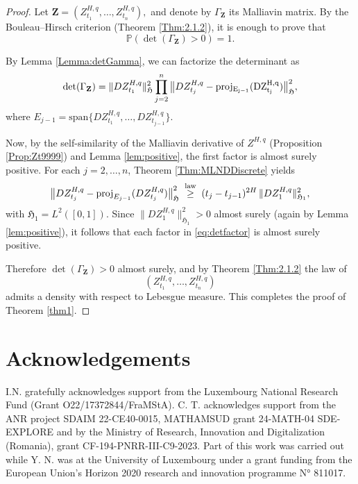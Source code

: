 \documentclass[a4paper,10pt]{article}
\theoremstyle{definition}
\theoremstyle{plain}
\newcommand\HHH{\mathfrak{H}}
\newcommand\1{\mathbbm{1}}
\newcommand\proj{\rm proj}
\begin{document}
\begin{proof} 
Let 
$
\mathbf{Z}=(Z^{H,q}_{t_1},\ldots, Z^{H,q}_{t_n}),
$
and denote by $\Gamma_{\mathbf{Z}}$ its Malliavin matrix.  
By the Bouleau--Hirsch criterion (Theorem \ref{Thm:2.1.2}), it is enough to prove that
\[
\mathbb{P}\!\left( \det (\Gamma_{\mathbf{Z}})>0\right)=1.
\]

By Lemma \ref{Lemma:detGamma}, we can factorize the determinant as
\begin{equation}\label{eq:detfactor}
\det(\Gamma_{\mathbf{Z}}) 
= \|DZ^{H,q}_{t_1}\|_{\HHH}^2
   \prod_{j=2}^n \big\|DZ^{H,q}_{t_j} - \proj_{E_{j-1}}(DZ^{H,q}_{t_j})\big\|_{\HHH}^2,
\end{equation}
where $E_{j-1}=\mathrm{span}\{DZ^{H,q}_{t_1},\ldots,DZ^{H,q}_{t_{j-1}}\}$.

Now, by the self-similarity of the Malliavin derivative of $Z^{H,q}$ (Proposition \ref{Prop:Zt9999}) and Lemma \ref{lem:positive}, the first factor is almost surely positive.
For each $j=2,\ldots,n$, Theorem \ref{Thm:MLNDDiscrete} yields
\[
\big\|DZ^{H,q}_{t_j} - {\rm proj}_{E_{j-1}}(DZ^{H,q}_{t_j})\big\|_{\HHH}^2
\;\overset{\text{law}}{\ge}\; (t_j-t_{j-1})^{2H}\,\|DZ^{H,q}_1\|_{\HHH_1}^2,
\]
with $\HHH_1=L^2([0,1])$.  
Since $\|DZ^{H,q}_1\|_{\HHH_1}^2>0$ almost surely (again by Lemma \ref{lem:positive}), it follows that each factor in \eqref{eq:detfactor} is almost surely positive.

Therefore $\det(\Gamma_{\mathbf{Z}})>0$ almost surely, and by Theorem \ref{Thm:2.1.2} the law of $$(Z^{H,q}_{t_1},\ldots,Z^{H,q}_{t_n})$$ admits a density with respect to Lebesgue measure.  
This completes the proof of Theorem \ref{thm1}.
\end{proof}



\section*{Acknowledgements}

I.N. gratefully acknowledges support from the Luxembourg National Research Fund (Grant O22/17372844/FraMStA).  C. T.  acknowledges support from   the  ANR project SDAIM 22-CE40-0015,  MATHAMSUD grant 24-MATH-04 SDE-EXPLORE and  by the Ministry of Research, Innovation and Digitalization (Romania), grant CF-194-PNRR-III-C9-2023.
Part of this work was carried out while Y. N. was at the University of Luxembourg under a grant funding from the European Union's Horizon 2020 research and innovation programme N° 811017. 
\end{document}

